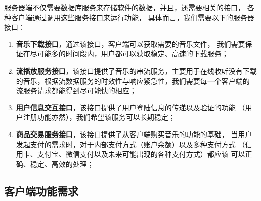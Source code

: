 服务器端不仅需要数据库服务来存储软件的数据，并且，还需要相关的接口，
各种客户端通过调用这些服务接口来运行功能，
具体而言，我们需要以下的服务器接口：
\begin{enumerate}
    \item \textbf{音乐下载接口}，通过该接口，客户端可以获取需要的音乐文件，
        我们需要保证在尽可能多的时间段内，用户都可以获取稳定、高速的下载服务；
    \item \textbf{流播放服务接口}，该接口提供了音乐的串流服务，主要用于在线收听没有下载
        的音乐，根据流数据服务的时效性与响应紧急性，我们需要每一个客户端的
        流服务请求都能得到尽可能快的相应；
    \item \textbf{用户信息交互接口}，该接口提供了用户登陆信息的传递以及验证的功能
        （用户注册功能亦然），我们希望该服务可以长期稳定；
    \item \textbf{商品交易服务接口}，该接口提供了从客户端购买音乐的功能的基础，
        当用户发起支付的需求时，对于内部支付方式（账户余额）以及多种支付方式
        （信用卡、支付宝、微信支付以及未来可能出现的各种支付方式）都应该
        可以正确、稳定、高效的处理；
\end{enumerate}

\subsection{客户端功能需求}

